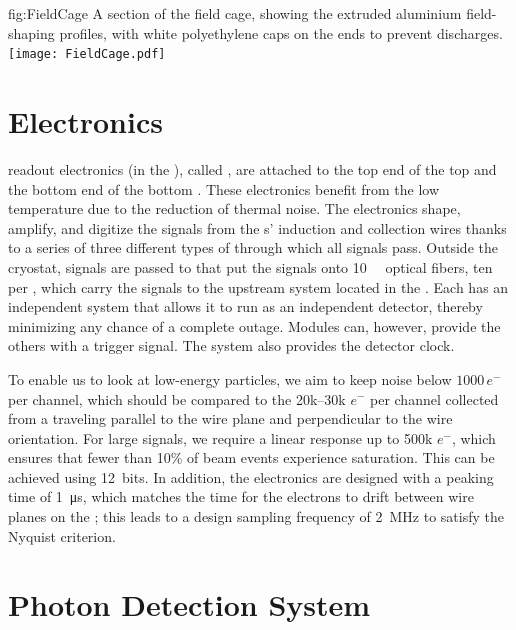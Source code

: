 \begin{dunefigure}{fig:FieldCage}
{A section of the field cage, showing the extruded aluminium field-shaping profiles, with white polyethylene caps on the ends to prevent discharges.}
\texttt{[image: FieldCage.pdf]}
\end{dunefigure}

\section{Electronics}
\label{sec:exec-sp-electronics}

 readout electronics (in the ), called , are attached to the top end of the top  and the bottom end of the bottom . These  electronics benefit from the low  temperature due to the reduction of thermal noise. The  electronics shape, amplify, and digitize the signals from the s' induction and collection wires thanks to a series of three different types of  through which all signals pass. 
Outside the cryostat, signals are passed to  that put the signals onto \SI{10}{\giga\byte} optical fibers, ten per , which carry the signals to the upstream  system located in the . Each  has an independent  system that allows it to run as an independent detector, thereby minimizing any chance of a complete  outage. Modules can, however, provide the others with a  trigger signal. The  system also provides the detector clock. 

To enable us to look at low-energy particles, we aim to keep noise below $1000\,e^{-}$ per channel, which should be compared to the 20k--30k $e^{-}$ per channel collected from a  traveling parallel to the wire plane and perpendicular to the wire orientation. For large signals, we require a linear response up to 500k $e^{-}$, which ensures that fewer than 10\% of beam events experience saturation. This can be achieved using 12\,  bits. In addition, the electronics are designed with a  peaking time of \SI{1}{\micro\second}, which matches the time for the electrons to drift between wire planes on the ; this leads to a design sampling frequency of \SI{2}{\mega\hertz} to satisfy the Nyquist criterion.

\section{Photon Detection System}
\label{sec:fdsp-exec-pds}

